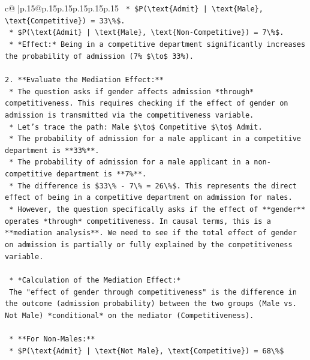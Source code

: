 \documentclass{article}
\begin{document}
{\begin{supertabular}{c@{$\;$}|p{.15\linewidth}@{}p{.15\linewidth}p{.15\linewidth}p{.15\linewidth}p{.15\linewidth}p{.15\linewidth}}
{{{\texttt{            *   \$P(\textbackslash{}text\{Admit\} | \textbackslash{}text\{Male\}, \textbackslash{}text\{Competitive\}) = 33\textbackslash{}\%\$.} \\
\texttt{            *   \$P(\textbackslash{}text\{Admit\} | \textbackslash{}text\{Male\}, \textbackslash{}text\{Non{-}Competitive\}) = 7\textbackslash{}\%\$.} \\
\texttt{            *   *Effect:* Being in a competitive department significantly increases the probability of admission (7\% \$\textbackslash{}to\$ 33\%).} \\
\\ 
\texttt{2.  **Evaluate the Mediation Effect:**} \\
\texttt{    *   The question asks if gender affects admission *through* competitiveness. This requires checking if the effect of gender on admission is transmitted via the competitiveness variable.} \\
\texttt{    *   Let's trace the path: Male \$\textbackslash{}to\$ Competitive \$\textbackslash{}to\$ Admit.} \\
\texttt{    *   The probability of admission for a male applicant in a competitive department is **33\%**.} \\
\texttt{    *   The probability of admission for a male applicant in a non{-}competitive department is **7\%**.} \\
\texttt{    *   The difference is \$33\textbackslash{}\% {-} 7\textbackslash{}\% = 26\textbackslash{}\%\$. This represents the direct effect of being in a competitive department on admission for males.} \\
\texttt{    *   However, the question specifically asks if the effect of **gender** operates *through* competitiveness. In causal terms, this is a **mediation analysis**. We need to see if the total effect of gender on admission is partially or fully explained by the competitiveness variable.} \\
\\ 
\texttt{    *   *Calculation of the Mediation Effect:*} \\
\texttt{        The "effect of gender through competitiveness" is the difference in the outcome (admission probability) between the two groups (Male vs. Not Male) *conditional* on the mediator (Competitiveness).} \\
\\ 
\texttt{        *   **For Non{-}Males:**} \\
\texttt{            *   \$P(\textbackslash{}text\{Admit\} | \textbackslash{}text\{Not Male\}, \textbackslash{}text\{Competitive\}) = 68\textbackslash{}\%\$} \\
}}}
\end{supertabular}}
\end{document}
